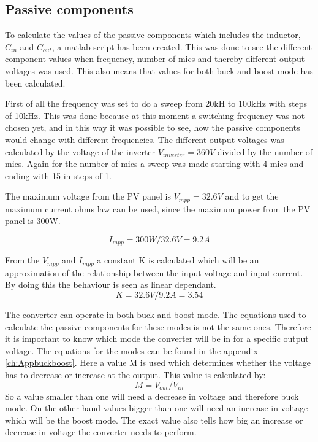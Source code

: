 \subsection{Passive components}  \label{passives}

To calculate the values of the passive components which includes the inductor, $C_{in}$ and $C_{out}$, a matlab  script has been created. This was done to see the different component values when frequency, number of mics and thereby different output voltages was used. This also means that values for both buck and boost mode has been calculated.

First of all the frequency was set to do a sweep from 20kH to 100kHz with steps of 10kHz. This was done because at this moment a switching frequency was not chosen yet, and in this way it was possible to see, how the passive components would change with different frequencies. 
The different output voltages was calculated by the voltage of the inverter $V_{inverter}=360V$ divided by the number of mics. Again for the number of mics a sweep was made starting with 4 mics and ending with 15 in steps of 1.

The maximum voltage from the PV panel is $V_{mpp}=32.6V$ 
and to get the maximum current ohms law can be used, since the maximum power from the PV panel is 300W.

\begin{equation}
I_{mpp} = 300W/32.6V = 9.2A
\end{equation} 

From the $V_{mpp}$ and $I_{mpp}$ a constant K is calculated which will be an approximation of the relationship between the input voltage and input current.
By doing this the behaviour is seen as linear dependant.
\begin{equation}
 K = 32.6V/9.2A = 3.54
 \end{equation} 

The converter can operate in both buck and boost mode. The equations used to calculate the passive components for these modes is not the same ones. Therefore it is important to know which mode the converter will be in for a specific output voltage.  
The equations for the modes can be found in the appendix \ref{ch:Appbuckboost}. Here a value M is used which determines whether the voltage has to decrease or increase at the output. This value is calculated by:
\begin{equation}
M = V_{out}/V_{in}
\end{equation}
So a value smaller than one will need a decrease in voltage and therefore buck mode. On the other hand values bigger than one will need an increase in voltage which will be the boost mode. The exact value also tells how big an increase or decrease in voltage the converter needs to perform. 

